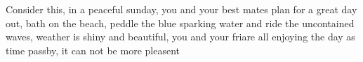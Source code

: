 Consider this, in a peaceful sunday, you and your best mates plan for a great day out, bath on the beach, peddle the blue sparking water and ride the uncontained waves, weather is shiny and beautiful, you and your friare all enjoying the day as time passby, it can not be more pleasent 